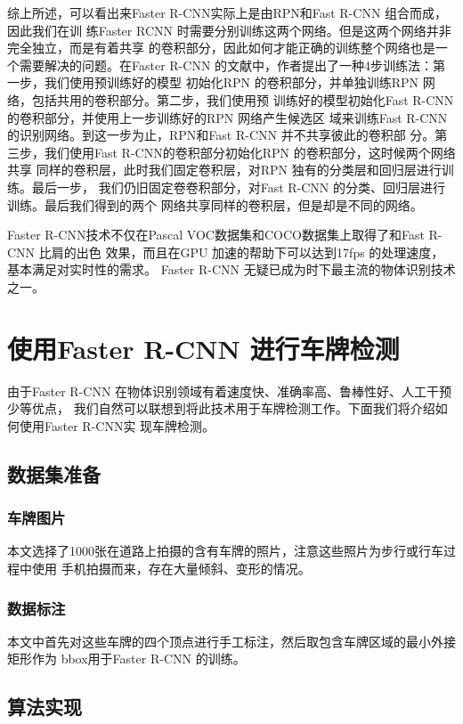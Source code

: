 综上所述，可以看出来Faster R-CNN实际上是由RPN和Fast R-CNN 组合而成，因此我们在训
练Faster RCNN 时需要分别训练这两个网络。但是这两个网络并非完全独立，而是有着共享
的卷积部分，因此如何才能正确的训练整个网络也是一个需要解决的问题。在Faster R-CNN
的文献\cite{Ren:2015ug}中，作者提出了一种4步训练法：第一步，我们使用预训练好的模型
初始化RPN 的卷积部分，并单独训练RPN 网络，包括共用的卷积部分。第二步，我们使用预
训练好的模型初始化Fast R-CNN 的卷积部分，并使用上一步训练好的RPN 网络产生候选区
域来训练Fast R-CNN 的识别网络。到这一步为止，RPN和Fast R-CNN 并不共享彼此的卷积部
分。第三步，我们使用Fast R-CNN的卷积部分初始化RPN 的卷积部分，这时候两个网络共享
同样的卷积层，此时我们固定卷积层，对RPN 独有的分类层和回归层进行训练。最后一步，
我们仍旧固定卷卷积部分，对Fast R-CNN 的分类、回归层进行训练。最后我们得到的两个
网络共享同样的卷积层，但是却是不同的网络。

Faster R-CNN技术不仅在Pascal VOC数据集和COCO数据集上取得了和Fast R-CNN 比肩的出色
效果，而且在GPU 加速的帮助下可以达到17fps 的处理速度，基本满足对实时性的需求。
Faster R-CNN 无疑已成为时下最主流的物体识别技术之一。

\section{使用Faster R-CNN 进行车牌检测}

由于Faster R-CNN 在物体识别领域有着速度快、准确率高、鲁棒性好、人工干预少等优点，
我们自然可以联想到将此技术用于车牌检测工作。下面我们将介绍如何使用Faster R-CNN实
现车牌检测。

\subsection{数据集准备}

\subsubsection{车牌图片}
本文选择了1000张在道路上拍摄的含有车牌的照片，注意这些照片为步行或行车过程中使用
手机拍摄而来，存在大量倾斜、变形的情况。

\subsubsection{数据标注}
本文中首先对这些车牌的四个顶点进行手工标注，然后取包含车牌区域的最小外接矩形作为
bbox用于Faster R-CNN 的训练。 

\subsection{算法实现}

